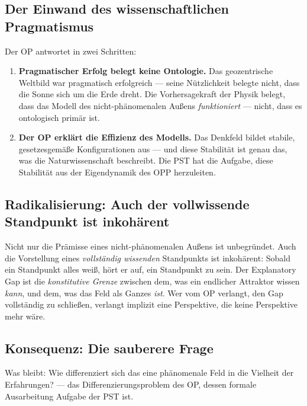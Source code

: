 \documentclass[11pt,a4paper]{article}
\theoremstyle{plain}
\theoremstyle{definition}
\begin{document}
\subsection{Der Einwand des wissenschaftlichen Pragmatismus}

Der OP antwortet in zwei Schritten:
\begin{enumerate}
  \item \textbf{Pragmatischer Erfolg belegt keine Ontologie.} Das geozentrische Weltbild
        war pragmatisch erfolgreich --- seine N\"{u}tzlichkeit belegte nicht, dass die
        Sonne sich um die Erde dreht. Die Vorhersagekraft der Physik belegt, dass das
        Modell des nicht-ph\"{a}nomenalen Au\ss{}ens \emph{funktioniert} --- nicht, dass
        es ontologisch prim\"{a}r ist.
  \item \textbf{Der OP erkl\"{a}rt die Effizienz des Modells.} Das Denkfeld bildet
        stabile, gesetzesgem\"{a}\ss{}e Konfigurationen aus --- und diese Stabilit\"{a}t
        ist genau das, was die Naturwissenschaft beschreibt. Die PST hat die Aufgabe,
        diese Stabilit\"{a}t aus der Eigendynamik des OPP herzuleiten.
\end{enumerate}

\subsection{Radikalisierung: Auch der vollwissende Standpunkt ist inkoh\"{a}rent}

Nicht nur die Pr\"{a}misse eines nicht-ph\"{a}nomenalen Au\ss{}ens ist unbegr\"{u}ndet.
Auch die Vorstellung eines \emph{vollst\"{a}ndig wissenden} Standpunkts ist inkoh\"{a}rent:
Sobald ein Standpunkt alles wei\ss{}, h\"{o}rt er auf, ein Standpunkt zu sein. Der
Explanatory Gap ist die \emph{konstitutive Grenze} zwischen dem, was ein endlicher
Attraktor wissen \emph{kann}, und dem, was das Feld als Ganzes \emph{ist}. Wer vom OP
verlangt, den Gap vollst\"{a}ndig zu schlie\ss{}en, verlangt implizit eine Perspektive,
die keine Perspektive mehr w\"{a}re.

\subsection{Konsequenz: Die sauberere Frage}

Was bleibt: \glqq{}Wie differenziert sich das eine ph\"{a}nomenale Feld in die Vielheit
der Erfahrungen?\grqq{} --- das Differenzierungsproblem des OP, dessen formale Ausarbeitung
Aufgabe der PST ist.
\end{document}
